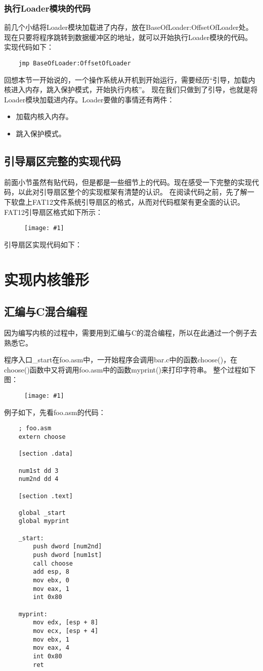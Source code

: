 \documentclass[a4paper,left=2.5cm,right=2.5cm,11pt]{article}
\newcommand{\fic}[1]{\begin{figure}[H]
		\center
		\texttt{[image: \#1]}
	\end{figure}}
\newcommand{\codefile}[1]{}
\begin{document}
\subsubsection{执行Loader模块的代码}
	前几个小结将Loader模块加载进了内存，放在BaseOfLoader:OffsetOfLoader处。现在只要将程序跳转到数据缓冲区的地址，就可以开始执行Loader模块的代码。
	实现代码如下：
	\begin{lstlisting}
	jmp BaseOfLoader:OffsetOfLoader
	\end{lstlisting}

	回想本节一开始说的，一个操作系统从开机到开始运行，需要经历“引导，加载内核进入内存，跳入保护模式，开始执行内核”。
	现在我们只做到了引导，也就是将Loader模块加载进内存。Loader要做的事情还有两件：
	\begin{itemize}
		\item 加载内核入内存。
		\item 跳入保护模式。
	\end{itemize}

\subsection{引导扇区完整的实现代码}
	前面小节虽然有贴代码，但是都是一些细节上的代码。现在感受一下完整的实现代码，以此对引导扇区整个的实现框架有清楚的认识。
	在阅读代码之前，先了解一下软盘上FAT12文件系统引导扇区的格式，从而对代码框架有更全面的认识。FAT12引导扇区格式如下所示：
	\fic{4.png}
	
	引导扇区实现代码如下：
	\codefile{boot.asm}

\clearpage

\section{实现内核雏形}

\subsection{汇编与C混合编程}
	因为编写内核的过程中，需要用到汇编与C的混合编程，所以在此通过一个例子去熟悉它。\par
	程序入口\_start在foo.asm中，一开始程序会调用bar.c中的函数choose()，在choose()函数中又将调用foo.asm中的函数myprint()来打印字符串。
	整个过程如下图：
	\fic{5.png}

	例子如下，先看foo.asm的代码：
	\begin{lstlisting}
	; foo.asm
	extern choose

	[section .data]

	num1st dd 3
	num2nd dd 4

	[section .text]

	global _start
	global myprint

	_start:
		push dword [num2nd]
		push dword [num1st]
		call choose
		add esp, 8
		mov ebx, 0
		mov eax, 1
		int 0x80
	
	myprint:
		mov edx, [esp + 8]
		mov ecx, [esp + 4]
		mov ebx, 1
		mov eax, 4
		int 0x80
		ret
	\end{lstlisting}
\end{document}
